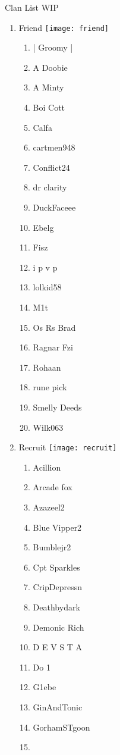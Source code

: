 \documentclass{article}
\begin{document}
Clan List WIP
\begin{enumerate}[I]
  \item 
    Friend \texttt{[image: friend]}
    \begin{enumerate}[I]
      \item
	| Groomy |
      \item
	A Doobie
      \item
	A Minty
      \item
	Boi Cott
      \item
	Calfa
      \item
	cartmen948
      \item
	Conflict24
      \item
	dr clarity
      \item
	DuckFaceee
      \item
	Ebelg
      \item
	Fisz
      \item
	i p v p
      \item
	lolkid58
      \item
	M1t
      \item
	Os Rs Brad
      \item
	Ragnar Fzi
      \item
	Rohaan
      \item
	rune pick
      \item
	Smelly Deeds
      \item
	Wilk063
    \end{enumerate}
  \item
    Recruit \texttt{[image: recruit]}
    \begin{enumerate}[I]
      \item 
	Acillion
      \item
	Arcade fox
      \item
	Azazeel2
      \item
	Blue Vipper2
      \item
	Bumblejr2
      \item
	Cpt Sparkles
      \item
	CripDepressn
      \item
	Deathbydark
      \item
	Demonic Rich
      \item
	D E V S T A
      \item
	Do 1
      \item
	G1ebe
      \item
	GinAndTonic
      \item
	GorhamSTgoon
      \item

\end{enumerate}
\end{enumerate}
\end{document}

